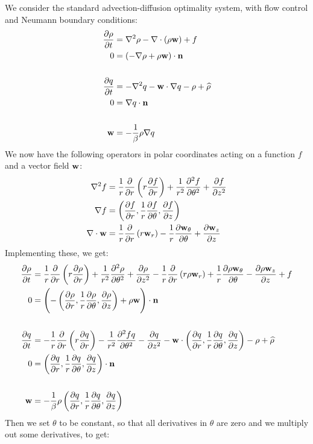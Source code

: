 We consider the standard advection-diffusion optimality system, with flow control and Neumann boundary conditions:
\begin{align*}
	\frac{\partial \rho}{\partial t} &= \nabla^2 \rho - \nabla \cdot (\rho \mathbf{w}) + f\\
	0 &= (- \nabla \rho + \rho \mathbf{w}) \cdot \mathbf{n} \\
	\\
	\frac{\partial q}{\partial t} &= - \nabla^2 q - \mathbf{w} \cdot \nabla q - \rho + \widehat \rho\\
	0 &= \nabla q \cdot \mathbf{n} \\
	\\
	\mathbf{w} &= - \frac{1}{\beta}\rho \nabla q
\end{align*}
We now have the following operators in polar coordinates acting on a function $f$ and a vector field $\mathbf{w}$:
\begin{align*}
	\nabla^2 f &= \frac{1}{r} \frac{\partial}{\partial r} \left( r \frac{\partial f}{\partial r}\right) + \frac{1}{r^2} \frac{\partial^2 f}{\partial \theta^2} + \frac{\partial f}{\partial z^2}\\
	\nabla f &= \left(\frac{\partial f}{\partial r}, \frac{1}{r}\frac{\partial f}{\partial \theta}, \frac{\partial f}{\partial z}\right)\\
	\nabla \cdot \mathbf{w} &= \frac{1}{r}\frac{\partial }{\partial r}\left(r \mathbf{w}_r\right) - \frac{1}{r}\frac{\partial \mathbf{w}_\theta}{\partial \theta} + \frac{\partial \mathbf{w}_z}{\partial z}
\end{align*}
Implementing these, we get:
\begin{align*}
	\frac{\partial \rho}{\partial t} &= \frac{1}{r} \frac{\partial}{\partial r} \left( r \frac{\partial \rho}{\partial r}\right) + \frac{1}{r^2} \frac{\partial^2 \rho}{\partial \theta^2} + \frac{\partial \rho}{\partial z^2} - \frac{1}{r}\frac{\partial }{\partial r}\left(r \rho\mathbf{w}_r\right) + \frac{1}{r}\frac{\partial \rho\mathbf{w}_\theta}{\partial \theta} - \frac{\partial \rho\mathbf{w}_z}{\partial z} + f\\
	0 &= \left(- \left(\frac{\partial \rho}{\partial r}, \frac{1}{r}\frac{\partial \rho}{\partial \theta}, \frac{\partial \rho}{\partial z}\right) + \rho \mathbf{w} \right) \cdot \mathbf{n} \\
	\\
	\frac{\partial q}{\partial t} &= -  \frac{1}{r} \frac{\partial}{\partial r} \left( r \frac{\partial q}{\partial r}\right) - \frac{1}{r^2} \frac{\partial^2 fq}{\partial \theta^2} - \frac{\partial q}{\partial z^2} - \mathbf{w} \cdot \left(\frac{\partial q}{\partial r}, \frac{1}{r}\frac{\partial q}{\partial \theta}, \frac{\partial q}{\partial z}\right) - \rho + \widehat \rho\\
	0 &= \left(\frac{\partial q}{\partial r}, \frac{1}{r}\frac{\partial q}{\partial \theta}, \frac{\partial q}{\partial z}\right) \cdot \mathbf{n} \\
	\\
	\mathbf{w} &= - \frac{1}{\beta}\rho  \left(\frac{\partial q}{\partial r}, \frac{1}{r}\frac{\partial q}{\partial \theta}, \frac{\partial q}{\partial z}\right)
\end{align*}
Then we set $\theta$ to be constant, so that all derivatives in $\theta$ are zero and we multiply out some derivatives, to get:

